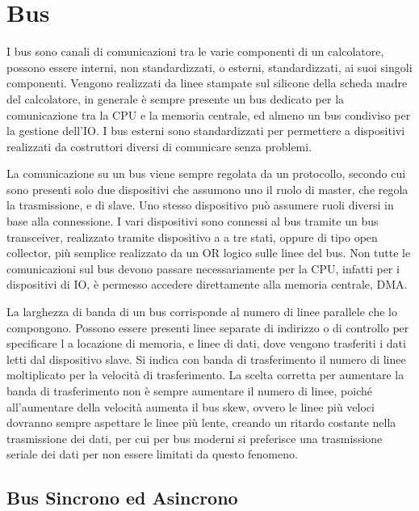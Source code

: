 \documentclass{article}
\numberwithin{equation}{subsection}
\begin{document}
\clearpage

\section{Bus}

I bus sono canali di comunicazioni tra le varie componenti di un calcolatore, possono essere interni, non standardizzati, o esterni, standardizzati, ai suoi singoli componenti. 
Vengono realizzati da linee stampate sul silicone della scheda madre del calcolatore, in generale è sempre presente un bus dedicato per la comunicazione tra la CPU e la memoria 
centrale, ed almeno un bus condiviso per la gestione dell'IO. I bus esterni sono standardizzati per permettere a dispositivi realizzati da costruttori diversi di comunicare 
senza problemi. 


La comunicazione su un bus viene sempre regolata da un protocollo, secondo cui sono presenti solo due dispositivi che assumono uno il ruolo di master, che regola la 
trasmissione, e di slave. Uno stesso dispositivo può assumere ruoli diversi in base alla connessione. I vari dispositivi sono connessi al bus tramite un bus transceiver, 
realizzato tramite dispositivo a a tre stati, oppure di tipo open collector, più semplice realizzato da un OR logico sulle linee del bus. 
Non tutte le comunicazioni sul bus devono passare necessariamente per la CPU, infatti per i dispositivi di IO, è permesso accedere direttamente alla memoria centrale, DMA. 

La larghezza di banda di un bus corrisponde al numero di linee parallele che lo compongono. Possono essere presenti linee separate di indirizzo o di controllo per specificare l
a locazione di memoria, e linee di dati, dove vengono trasferiti i dati letti dal dispositivo slave. Si indica con banda di trasferimento il numero di linee moltiplicato per la velocità 
di trasferimento. 
La scelta corretta per aumentare la banda di trasferimento non è sempre aumentare il numero di linee, poiché all'aumentare della velocità aumenta il bus skew, ovvero le linee 
più veloci dovranno sempre aspettare le linee più lente, creando un ritardo costante nella trasmissione dei dati, per cui per bus moderni si preferisce una trasmissione seriale 
dei dati per non essere limitati da questo fenomeno. 

\subsection{Bus Sincrono ed Asincrono}
\end{document}
